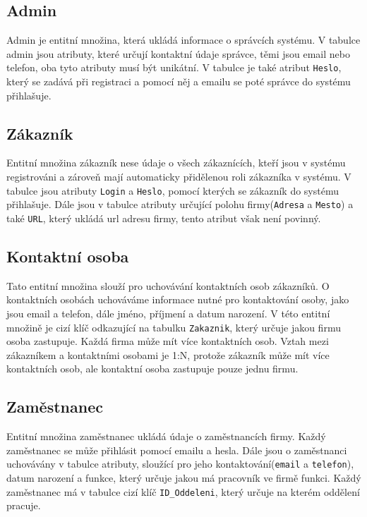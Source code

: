 \newpage

\subsection{Admin}
Admin je entitní množina, která ukládá informace o správcích systému. V tabulce admin jsou atributy, které určují kontaktní údaje správce, těmi jsou email nebo telefon, oba tyto atributy musí být unikátní. V tabulce je také atribut \texttt{Heslo}, který se zadává při registraci a pomocí něj a emailu se poté správce do systému přihlašuje.


\subsection{Zákazník}
Entitní množina zákazník nese údaje o všech zákaznících, kteří jsou v systému registrováni a zároveň mají automaticky přidělenou roli zákazníka v systému. V tabulce jsou atributy \texttt{Login} a \texttt{Heslo}, pomocí kterých se zákazník do systému přihlašuje. Dále jsou v tabulce atributy určující polohu firmy(\texttt{Adresa} a \texttt{Mesto}) a také \texttt{URL}, který ukládá url adresu firmy, tento atribut však není povinný.

\subsection{Kontaktní osoba}
Tato entitní množina slouží pro uchovávání kontaktních osob zákazníků. O kontaktních osobách uchováváme informace nutné pro kontaktování osoby, jako jsou email a telefon, dále jméno, příjmení a datum narození. V této entitní množině je cizí klíč odkazující na tabulku \texttt{Zakaznik}, který určuje jakou firmu osoba zastupuje. Každá firma může mít více kontaktních osob. Vztah mezi zákazníkem a kontaktními osobami je 1:N, protože zákazník může mít více kontaktních osob, ale kontaktní osoba zastupuje pouze jednu firmu.


\subsection{Zaměstnanec}
Entitní množina zaměstnanec ukládá údaje o zaměstnancích firmy. Každý zaměstnanec se může přihlásit pomocí emailu a hesla. Dále jsou o zaměstnanci uchovávány v tabulce atributy, sloužící pro jeho kontaktování(\texttt{email} a \texttt{telefon}), datum narození a funkce, který určuje jakou má pracovník  ve firmě funkci. Každý zaměstnanec má v tabulce cizí klíč \texttt{ID\_Oddeleni}, který určuje na kterém oddělení pracuje. 

